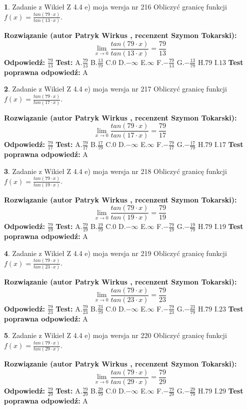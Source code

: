 \documentclass[12pt, a4paper]{article}
\theoremstyle{definition} %
\newtheorem{zad}{}
\newcommand{\zadStart}[1]{\begin{zad}#1\newline}
\newcommand{\zadStop}{\end{zad}}
\newcommand{\rozwStart}[2]{\noindent \textbf{Rozwiązanie (autor #1 , recenzent #2): }\newline}
\newcommand{\rozwStop}{\newline}
\newcommand{\odpStart}{\noindent \textbf{Odpowiedź:}\newline}
\newcommand{\odpStop}{\newline}
\newcommand{\testStart}{\noindent \textbf{Test:}\newline}
\newcommand{\testStop}{\newline}
\newcommand{\kluczStart}{\noindent \textbf{Test poprawna odpowiedź:}\newline}
\newcommand{\kluczStop}{\newline}
\begin{document}
\zadStart{Zadanie z Wikieł Z 4.4 e) moja wersja nr 216}
Obliczyć granicę funkcji $f(x)=\frac{tan(79\cdot x)}{tan(13\cdot x)}$.
\zadStop
\rozwStart{Patryk Wirkus}{Szymon Tokarski}
$$\lim\limits_{x\to 0}\frac{tan(79\cdot x)}{tan(13\cdot x)}=
\frac{79}{13}$$
\rozwStop
\odpStart
$\frac{79}{13}$
\odpStop
\testStart
A.$\frac{79}{13}$
B.$\frac{13}{79}$
C.$0$
D.$-\infty$
E.$\infty$
F.$-\frac{79}{13}$
G.$-\frac{13}{79}$
H.$79$
I.$13$
\testStop
\kluczStart
A
\kluczStop



\zadStart{Zadanie z Wikieł Z 4.4 e) moja wersja nr 217}
Obliczyć granicę funkcji $f(x)=\frac{tan(79\cdot x)}{tan(17\cdot x)}$.
\zadStop
\rozwStart{Patryk Wirkus}{Szymon Tokarski}
$$\lim\limits_{x\to 0}\frac{tan(79\cdot x)}{tan(17\cdot x)}=
\frac{79}{17}$$
\rozwStop
\odpStart
$\frac{79}{17}$
\odpStop
\testStart
A.$\frac{79}{17}$
B.$\frac{17}{79}$
C.$0$
D.$-\infty$
E.$\infty$
F.$-\frac{79}{17}$
G.$-\frac{17}{79}$
H.$79$
I.$17$
\testStop
\kluczStart
A
\kluczStop



\zadStart{Zadanie z Wikieł Z 4.4 e) moja wersja nr 218}
Obliczyć granicę funkcji $f(x)=\frac{tan(79\cdot x)}{tan(19\cdot x)}$.
\zadStop
\rozwStart{Patryk Wirkus}{Szymon Tokarski}
$$\lim\limits_{x\to 0}\frac{tan(79\cdot x)}{tan(19\cdot x)}=
\frac{79}{19}$$
\rozwStop
\odpStart
$\frac{79}{19}$
\odpStop
\testStart
A.$\frac{79}{19}$
B.$\frac{19}{79}$
C.$0$
D.$-\infty$
E.$\infty$
F.$-\frac{79}{19}$
G.$-\frac{19}{79}$
H.$79$
I.$19$
\testStop
\kluczStart
A
\kluczStop



\zadStart{Zadanie z Wikieł Z 4.4 e) moja wersja nr 219}
Obliczyć granicę funkcji $f(x)=\frac{tan(79\cdot x)}{tan(23\cdot x)}$.
\zadStop
\rozwStart{Patryk Wirkus}{Szymon Tokarski}
$$\lim\limits_{x\to 0}\frac{tan(79\cdot x)}{tan(23\cdot x)}=
\frac{79}{23}$$
\rozwStop
\odpStart
$\frac{79}{23}$
\odpStop
\testStart
A.$\frac{79}{23}$
B.$\frac{23}{79}$
C.$0$
D.$-\infty$
E.$\infty$
F.$-\frac{79}{23}$
G.$-\frac{23}{79}$
H.$79$
I.$23$
\testStop
\kluczStart
A
\kluczStop



\zadStart{Zadanie z Wikieł Z 4.4 e) moja wersja nr 220}
Obliczyć granicę funkcji $f(x)=\frac{tan(79\cdot x)}{tan(29\cdot x)}$.
\zadStop
\rozwStart{Patryk Wirkus}{Szymon Tokarski}
$$\lim\limits_{x\to 0}\frac{tan(79\cdot x)}{tan(29\cdot x)}=
\frac{79}{29}$$
\rozwStop
\odpStart
$\frac{79}{29}$
\odpStop
\testStart
A.$\frac{79}{29}$
B.$\frac{29}{79}$
C.$0$
D.$-\infty$
E.$\infty$
F.$-\frac{79}{29}$
G.$-\frac{29}{79}$
H.$79$
I.$29$
\testStop
\kluczStart
A
\kluczStop
\end{document}
